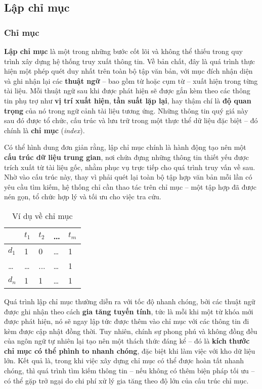 \subsection{Lập chỉ mục}
\subsubsection{Chỉ mục}
\textbf{Lập chỉ mục} là một trong những bước cốt lõi và không thể thiếu trong quy trình xây dựng hệ thống truy xuất thông tin. Về bản chất, đây là quá trình thực hiện một phép quét duy nhất trên toàn bộ tập văn bản, với mục đích nhận diện và ghi nhận lại các \textbf{thuật ngữ} -- bao gồm từ hoặc cụm từ -- xuất hiện trong từng tài liệu. Mỗi thuật ngữ sau khi được phát hiện sẽ được gắn kèm theo các thông tin phụ trợ như \textbf{vị trí xuất hiện}, \textbf{tần suất lặp lại}, hay thậm chí là \textbf{độ quan trọng} của nó trong ngữ cảnh tài liệu tương ứng. Những thông tin quý giá này sau đó được tổ chức, cấu trúc và lưu trữ trong một thực thể dữ liệu đặc biệt -- đó chính là \textbf{chỉ mục} (\textit{index}).

Có thể hình dung đơn giản rằng, lập chỉ mục chính là hành động tạo nên một \textbf{cấu trúc dữ liệu trung gian}, nơi chứa đựng những thông tin thiết yếu được trích xuất từ tài liệu gốc, nhằm phục vụ trực tiếp cho quá trình truy vấn về sau. Nhờ vào cấu trúc này, thay vì phải quét lại toàn bộ tập hợp văn bản mỗi lần có yêu cầu tìm kiếm, hệ thống chỉ cần thao tác trên chỉ mục -- một tập hợp đã được nén gọn, tổ chức hợp lý và tối ưu cho việc tra cứu.

\begin{table}[H]
    \caption{Ví dụ về chỉ mục}
    \begin{center}
        \begin{tabularx}{0.8\linewidth}{X || X X X X}
            \toprule
                    & \(t_1\) & \(t_2\) & \dots & \(t_m\) \\
            \midrule\midrule
            \(d_1\) & 1       & 0       & \dots & 1       \\
            \dots   & \dots   & ...     & \dots & 1       \\
            \(d_n\) & 1       & 1       & \dots & 1       \\
            \bottomrule
        \end{tabularx}
    \end{center}
\end{table}

Quá trình lập chỉ mục thường diễn ra với tốc độ nhanh chóng, bởi các thuật ngữ được ghi nhận theo cách \textbf{gia tăng tuyến tính}, tức là mỗi khi một từ khóa mới được phát hiện, nó sẽ ngay lập tức được thêm vào chỉ mục với các thông tin đi kèm được cập nhật đồng thời. Tuy nhiên, chính sự phong phú và không đồng đều của ngôn ngữ tự nhiên lại tạo nên một thách thức đáng kể -- đó là \textbf{kích thước chỉ mục có thể phình to nhanh chóng}, đặc biệt khi làm việc với kho dữ liệu lớn. Kết quả là, trong khi việc xây dựng chỉ mục có thể được hoàn tất nhanh chóng, thì quá trình tìm kiếm thông tin -- nếu không có thêm biện pháp tối ưu -- có thể gặp trở ngại do chi phí xử lý gia tăng theo độ lớn của cấu trúc chỉ mục.


